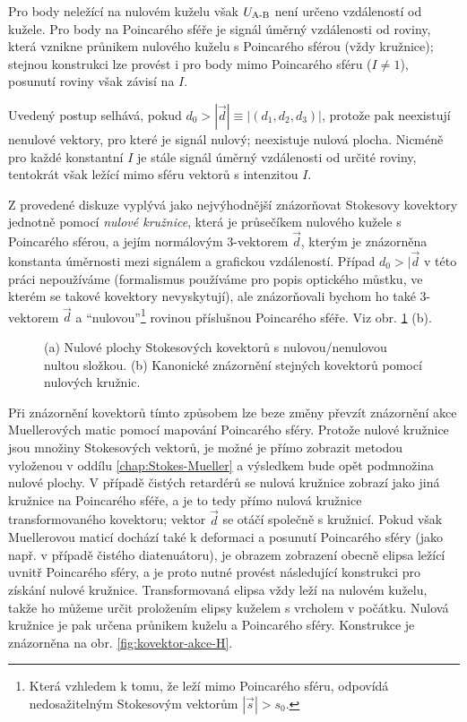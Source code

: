 Pro body neležící na nulovém kuželu však $U_\textrm{A-B}$ není určeno vzdáleností od kužele.
Pro body na Poincarého sféře je signál úměrný vzdálenosti od roviny, která vznikne průnikem nulového kuželu s Poincarého sférou (vždy kružnice); stejnou konstrukci lze provést i pro body mimo Poincarého sféru ($I\neq1$), posunutí roviny však závisí na $I$.

Uvedený postup selhává, pokud $d_0>|\vec{d}|\equiv|(d_1, d_2, d_3)|$, protože pak neexistují nenulové vektory, pro které je signál nulový; neexistuje nulová plocha.
Nicméně pro každé konstantní $I$ je stále signál úměrný vzdálenosti od určité roviny, tentokrát však ležící mimo sféru vektorů s intenzitou $I$.

Z provedené diskuze vyplývá jako nejvýhodnější znázorňovat Stokesovy kovektory jednotně pomocí \emph{nulové kružnice}, která je průsečíkem nulového kužele s Poincarého sférou, a jejím normálovým 3-vektorem $\vec{d}$, kterým je znázorněna konstanta úměrnosti mezi signálem a grafickou vzdáleností.
Případ $d_0>|\vec{d}$ v této práci nepoužíváme (formalismus používáme pro popis optického můstku, ve kterém se takové kovektory nevyskytují), ale znázorňovali bychom ho také 3-vektorem $\vec{d}$ a ``nulovou''\footnote{Která vzhledem k tomu, že leží mimo Poincarého sféru, odpovídá nedosažitelným Stokesovým vektorům $|\vec{s}|>s_0$.} rovinou příslušnou Poincarého sféře.
Viz obr. \ref{fig:mustek-znazorneni-kovektoru} (b).

\begin{figure}[htbp]
    \centering
    \caption{(a) Nulové plochy Stokesových kovektorů s nulovou/nenulovou nultou složkou. (b) Kanonické znázornění stejných kovektorů pomocí nulových kružnic.}
    \label{fig:mustek-znazorneni-kovektoru}
\end{figure}

Při znázornění kovektorů tímto způsobem lze beze změny převzít znázornění akce Muellerových matic pomocí mapování Poincarého sféry.
Protože nulové kružnice jsou množiny Stokesových vektorů, je možné je přímo zobrazit metodou vyloženou v oddílu \ref{chap:Stokes-Mueller} a výsledkem bude opět podmnožina nulové plochy.
V případě čistých retardérů se nulová kružnice zobrazí jako jiná kružnice na Poincarého sféře, a je to tedy přímo nulová kružnice transformovaného kovektoru; vektor $\vec{d}$ se otáčí společně s kružnicí.
Pokud však Muellerovou maticí dochází také k deformaci a posunutí Poincarého sféry (jako např. v případě čistého diatenuátoru), je obrazem zobrazení obecně elipsa ležící uvnitř Poincarého sféry, a je proto nutné provést následující konstrukci pro získání nulové kružnice.
Transformovaná elipsa vždy leží na nulovém kuželu, takže ho můžeme určit proložením elipsy kuželem s vrcholem v počátku.
Nulová kružnice je pak určena průnikem kuželu a Poincarého sféry.
Konstrukce je znázorněna na obr. \ref{fig:kovektor-akce-H}.

